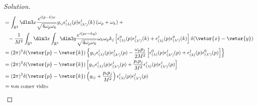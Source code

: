 \begin{proof}[Solution]
\begin{align*}
      &= \int_{\mathbb{R}^3} \dln3x \frac{e^{i(p - k)x}}{\sqrt{4 \omega_p \omega_k}} g_{ij}\epsilon^i_{(\lambda)}(p) \epsilon^j_{(\lambda')}(k)\left(\omega_p + \omega_k  \right) + {}\\
      &{}\phantom{=} - \frac{1}{M^2}\int_{\mathbb{R}^3}\dln3x \int_{\mathbb{R}^3}\dln3y\frac{e^{i(px - ky)}}{\sqrt{4 \omega_p \omega_k}} \omega_k \omega_p k_j \left[\epsilon^0_{(\lambda)}(p) \epsilon^j_{(\lambda')}(k) + \epsilon^j_{(\lambda)}(p) \epsilon^0_{(\lambda')}(k)\right]\delta(\vetor{x} - \vetor{y})\\
      &= (2\pi)^3 \delta(\vetor{p} - \vetor{k})\left\{g_{ij} \epsilon^i_{(\lambda)}(p) \epsilon^j_{(\lambda')}(p) - \frac{\omega_p p_j}{2M^2}\left[\epsilon^0_{(\lambda)}(p) \epsilon^j_{(\lambda')}(p) + \epsilon^j_{(\lambda)}(p) \epsilon^0_{(\lambda')}(p)\right]\right\}\\
      &= (2\pi)^3 \delta(\vetor{p} - \vetor{k}) \left[g_{ij} \epsilon^i_{(\lambda)}(p) \epsilon^j_{(\lambda')}(p) + \frac{p_ip_j}{M^2} \epsilon^i_{(\lambda)} (p)\epsilon^j_{(\lambda')}(p)\right]\\
      &= (2\pi)^3 \delta(\vetor{p} - \vetor{k}) \left(g_{ij} + \frac{p_i p_j}{M^2}\right)\epsilon^i_{(\lambda)}(p) \epsilon^j_{(\lambda')}(p)\\
      &= \text{vou comer vidro}
   \end{align*}


\end{proof}
